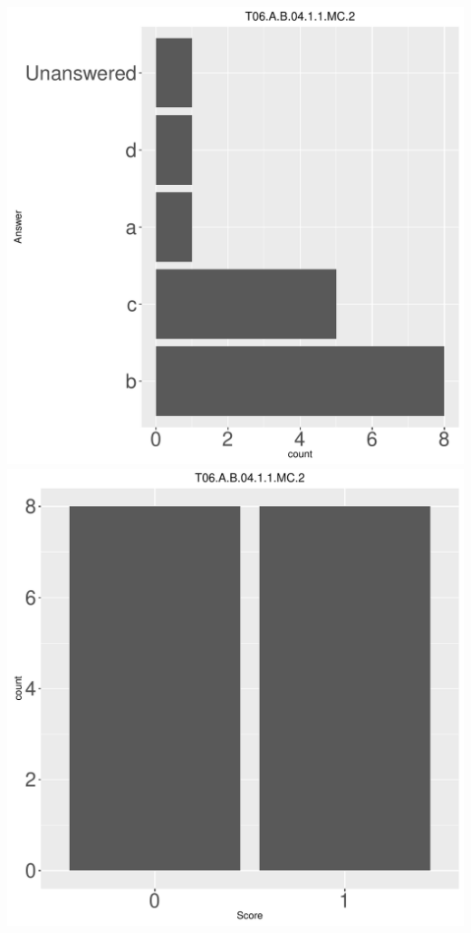 \documentclass[12pt,english,nohyper]{tufte-handout}\usepackage[]{graphicx}\usepackage[]{color}
\begin{document}
\begin{center} \includegraphics[width=.45\linewidth]{Topic06_AB_6_answer} \includegraphics[width=.45\linewidth]{Topic06_AB_6_score} \end{center} 
\end{document}
